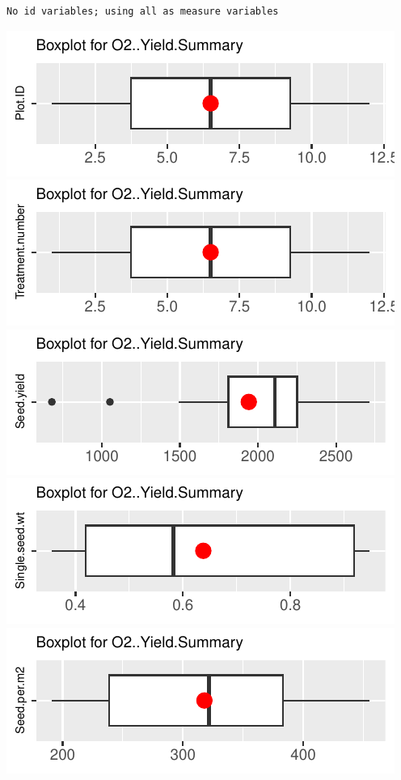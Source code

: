 \documentclass[
]{article}
\begin{document}
\begin{verbatim}
No id variables; using all as measure variables
\end{verbatim}

\includegraphics{FL_Crop_BMP_QA_single_dataset_files/figure-latex/check-content-of-sheets-19.pdf}
\includegraphics{FL_Crop_BMP_QA_single_dataset_files/figure-latex/check-content-of-sheets-20.pdf}
\includegraphics{FL_Crop_BMP_QA_single_dataset_files/figure-latex/check-content-of-sheets-21.pdf}
\includegraphics{FL_Crop_BMP_QA_single_dataset_files/figure-latex/check-content-of-sheets-22.pdf}
\includegraphics{FL_Crop_BMP_QA_single_dataset_files/figure-latex/check-content-of-sheets-23.pdf}
\end{document}
